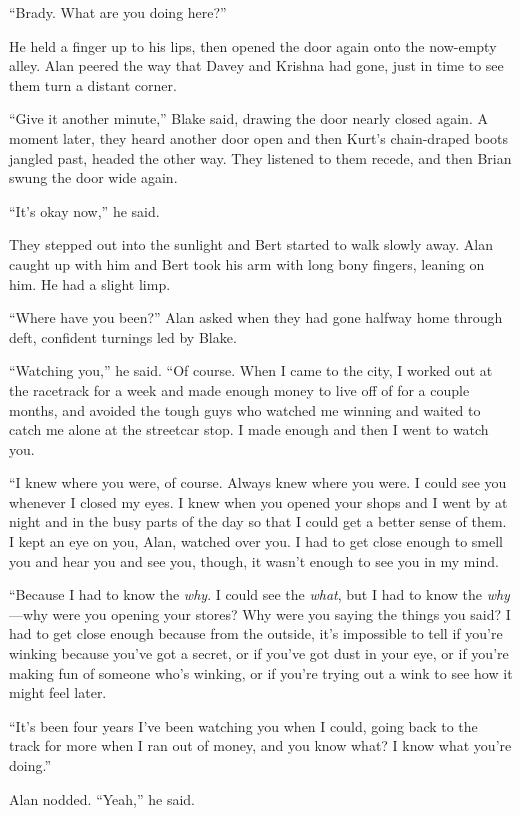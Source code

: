 \documentclass{article}
\begin{document}
``Brady.  What are you doing here?''

He held a finger up to his lips, then opened the door again onto the
now-empty alley.  Alan peered the way that Davey and Krishna had gone,
just in time to see them turn a distant corner.

``Give it another minute,'' Blake said, drawing the door nearly closed
again.  A moment later, they heard another door open and then Kurt's
chain-draped boots jangled past, headed the other way.  They listened
to them recede, and then Brian swung the door wide again.

``It's okay now,'' he said.

They stepped out into the sunlight and Bert started to walk slowly
away.  Alan caught up with him and Bert took his arm with long bony
fingers, leaning on him.  He had a slight limp.

``Where have you been?'' Alan asked when they had gone halfway home
through deft, confident turnings led by Blake.

``Watching you,'' he said.  ``Of course.  When I came to the city, I
worked out at the racetrack for a week and made enough money to live
off of for a couple months, and avoided the tough guys who watched me
winning and waited to catch me alone at the streetcar stop.  I made
enough and then I went to watch you.

``I knew where you were, of course.  Always knew where you were.  I
could see you whenever I closed my eyes.  I knew when you opened your
shops and I went by at night and in the busy parts of the day so that
I could get a better sense of them.  I kept an eye on you, Alan,
watched over you.  I had to get close enough to smell you and hear you
and see you, though, it wasn't enough to see you in my mind.

``Because I had to know the \textit{why}.  I could see the
\textit{what}, but I had to know the \textit{why}---why were you
opening your stores?  Why were you saying the things you said?  I had
to get close enough because from the outside, it's impossible to tell
if you're winking because you've got a secret, or if you've got dust
in your eye, or if you're making fun of someone who's winking, or if
you're trying out a wink to see how it might feel later.

``It's been four years I've been watching you when I could, going back
to the track for more when I ran out of money, and you know what?  I
know what you're doing.''

Alan nodded.  ``Yeah,'' he said.
\end{document}

